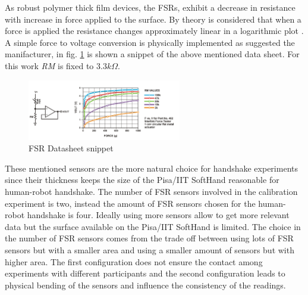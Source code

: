 As robust polymer thick film devices, the FSRs, exhibit a decrease in resistance with increase in force applied to the surface. By theory is considered that when a force is applied the resistance changes approximately linear in a logarithmic plot \cite{fsrdatasheet}.
A simple force to voltage conversion is physically implemented as suggested the manifacturer, in fig. \ref{Fig:FSRcircuit} is shown a snippet of the above mentioned data sheet. For this work \textit{RM} is fixed to $3.3 k \Omega $. 
\begin{figure}[ht]
\centering
\includegraphics[width=0.6\textwidth]{Figure/fsr.png}
\caption{FSR Datasheet snippet}
\label{Fig:FSRcircuit}
\end{figure}
These mentioned sensors are the more natural choice for handshake experiments since their thickness keeps the size of the Pisa/IIT SoftHand reasonable for human-robot handshake. The number of FSR sensors involved in the calibration experiment is two, instead the amount of FSR sensors chosen for the human-robot handshake is four. Ideally using more sensors allow to get more relevant data but the surface available on the Pisa/IIT SoftHand is limited. The choice in the number of FSR sensors comes from the trade off between using lots of FSR sensors but with a smaller area and using a smaller amount of sensors but with higher area. The first configuration does not ensure the contact among experiments with different participants and the second configuration leads to physical bending of the sensors and influence the consistency of the readings. %

